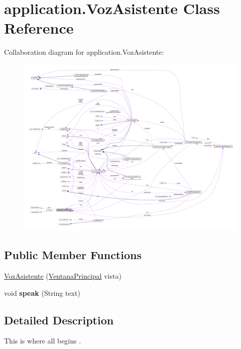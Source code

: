 \hypertarget{classapplication_1_1_voz_asistente}{}\section{application.\+Voz\+Asistente Class Reference}
\label{classapplication_1_1_voz_asistente}


Collaboration diagram for application.\+Voz\+Asistente\+:
\nopagebreak
\begin{figure}[H]
\begin{center}
\leavevmode
\includegraphics[width=350pt]{classapplication_1_1_voz_asistente__coll__graph}
\end{center}
\end{figure}
\subsection*{Public Member Functions}
\begin{DoxyCompactItemize}
\item 
\mbox{\hyperlink{classapplication_1_1_voz_asistente_abbcb08ba9e4c065c9c40c2d0e554808b}{Voz\+Asistente}} (\mbox{\hyperlink{classvista_1_1_ventana_principal}{Ventana\+Principal}} vista)
\item 
\mbox{\label{classapplication_1_1_voz_asistente_adc472387531a7d0bdbb256278ab58828}} 
void {\bfseries speak} (String text)
\end{DoxyCompactItemize}


\subsection{Detailed Description}
This is where all begins .

